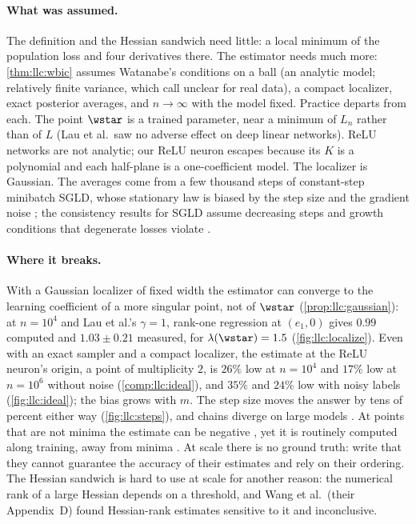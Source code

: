 \begin{refsection}
\paragraph{What was assumed.} The definition and the Hessian sandwich need little: a local minimum of the population loss and four derivatives there. The estimator needs much more: \cref{thm:llc:wbic} assumes Watanabe's conditions on a ball (an analytic model; relatively finite variance, which \textcite{LauEtAl2025} call unclear for real data), a compact localizer, exact posterior averages, and $n\to\infty$ with the model fixed. Practice departs from each. The point $\wstar$ is a trained parameter, near a minimum of $L_n$ rather than of $L$ (Lau et al.\ saw no adverse effect on deep linear networks). ReLU networks are not analytic; our ReLU neuron escapes because its $K$ is a polynomial and each half-plane is a one-coefficient model. The localizer is Gaussian. The averages come from a few thousand steps of constant-step minibatch SGLD, whose stationary law is biased by the step size and the gradient noise \parencite{BrosseEtAl2018}; the consistency results for SGLD assume decreasing steps and growth conditions \parencite{TehEtAl2016} that degenerate losses violate \parencite{HitchcockHoogland2025}.

\paragraph{Where it breaks.} With a Gaussian localizer of fixed width the estimator can converge to the learning coefficient of a more singular point, not of $\wstar$ (\cref{prop:llc:gaussian}): at $n=10^4$ and Lau et al.'s $\gamma=1$, rank-one regression at $(e_1,0)$ gives $0.99$ computed and $1.03\pm0.21$ measured, for $\lambda(\wstar)=1.5$ (\cref{fig:llc:localize}). Even with an exact sampler and a compact localizer, the estimate at the ReLU neuron's origin, a point of multiplicity $2$, is $26\%$ low at $n=10^4$ and $17\%$ low at $n=10^6$ without noise (\cref{comp:llc:ideal}), and $35\%$ and $24\%$ low with noisy labels (\cref{fig:llc:ideal}); the bias grows with $m$. The step size moves the answer by tens of percent either way (\cref{fig:llc:steps}), and chains diverge on large models \parencite{LauEtAl2025}. At points that are not minima the estimate can be negative \parencite{LauEtAl2025,ChenEtAl2023}, yet it is routinely computed along training, away from minima \parencite{HooglandEtAl2025}. At scale there is no ground truth: \textcite{WangEtAl2025a} write that they cannot guarantee the accuracy of their estimates and rely on their ordering. The Hessian sandwich is hard to use at scale for another reason: the numerical rank of a large Hessian depends on a threshold, and Wang et al.\ (their Appendix~D) found Hessian-rank estimates sensitive to it and inconclusive.


\end{refsection}
